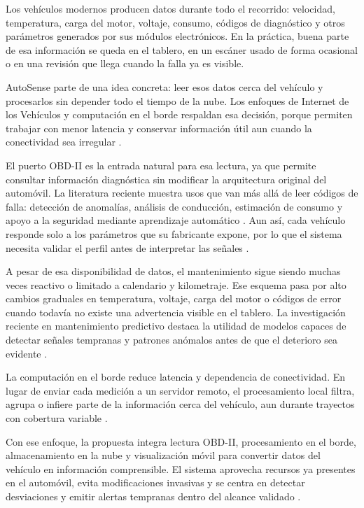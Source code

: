 \documentclass[12pt,letterpaper]{report}
\begin{document}
Los vehículos modernos producen datos durante todo el recorrido: velocidad, temperatura, carga del motor, voltaje, consumo, códigos de diagnóstico y otros parámetros generados por sus módulos electrónicos. En la práctica, buena parte de esa información se queda en el tablero, en un escáner usado de forma ocasional o en una revisión que llega cuando la falla ya es visible.

AutoSense parte de una idea concreta: leer esos datos cerca del vehículo y procesarlos sin depender todo el tiempo de la nube. Los enfoques de Internet de los Vehículos y computación en el borde respaldan esa decisión, porque permiten trabajar con menor latencia y conservar información útil aun cuando la conectividad sea irregular \cite{zhang2020_iov_edge,kalalas2025_ai_driven_monitoring}.

El puerto OBD-II es la entrada natural para esa lectura, ya que permite consultar información diagnóstica sin modificar la arquitectura original del automóvil. La literatura reciente muestra usos que van más allá de leer códigos de falla: detección de anomalías, análisis de conducción, estimación de consumo y apoyo a la seguridad mediante aprendizaje automático \cite{michailidis2025_obdii_review}. Aun así, cada vehículo responde solo a los parámetros que su fabricante expone, por lo que el sistema necesita validar el perfil antes de interpretar las señales \cite{sae2022_j1978_obdii_scan_tool,sae2025_j1979_diagnostic_test_modes}.

A pesar de esa disponibilidad de datos, el mantenimiento sigue siendo muchas veces reactivo o limitado a calendario y kilometraje. Ese esquema pasa por alto cambios graduales en temperatura, voltaje, carga del motor o códigos de error cuando todavía no existe una advertencia visible en el tablero. La investigación reciente en mantenimiento predictivo destaca la utilidad de modelos capaces de detectar señales tempranas y patrones anómalos antes de que el deterioro sea evidente \cite{mahale2025_review_predictive_maintenance,tormos2025_explainable_ai}.

La computación en el borde reduce latencia y dependencia de conectividad. En lugar de enviar cada medición a un servidor remoto, el procesamiento local filtra, agrupa o infiere parte de la información cerca del vehículo, aun durante trayectos con cobertura variable \cite{zhang2020_iov_edge,minamy2025_edgecomputing,kalalas2025_ai_driven_monitoring}.

Con ese enfoque, la propuesta integra lectura OBD-II, procesamiento en el borde, almacenamiento en la nube y visualización móvil para convertir datos del vehículo en información comprensible. El sistema aprovecha recursos ya presentes en el automóvil, evita modificaciones invasivas y se centra en detectar desviaciones y emitir alertas tempranas dentro del alcance validado \cite{selvaraj2023_advanced_telematics,michailidis2025_obdii_review,mahale2025_review_predictive_maintenance,sae2022_j1978_obdii_scan_tool}.
\end{document}
